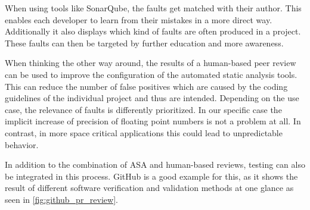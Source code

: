 \documentclass{scrartcl}
\begin{document}
When using tools like SonarQube, the faults get matched with their author. This enables each developer to learn from their mistakes in a more direct way. Additionally it also displays which kind of faults are often produced in a project. These faults can then be targeted by further education and more awareness.

When thinking the other way around, the results of a human-based peer review can be used to improve the configuration of the automated static analysis tools. This can reduce the number of false positives which are caused by the coding guidelines of the individual project and thus are intended.
Depending on the use case, the relevance of faults is differently prioritized. In our specific case the implicit increase of precision of floating point numbers is not a problem at all. In contrast, in more space critical applications this could lead to unpredictable behavior.

In addition to the combination of ASA and human-based reviews, testing can also be integrated in this process. GitHub is a good example for this, as it shows the result of different software verification and validation methods at one glance as seen in \vref{fig:github_pr_review}.
\end{document}
